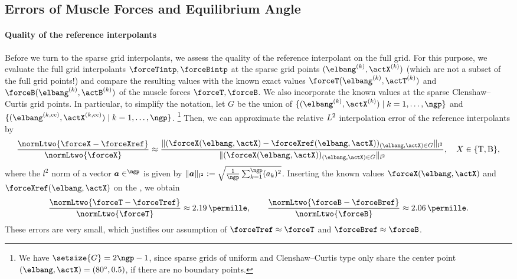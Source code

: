 \subsection{Errors of Muscle Forces and Equilibrium Angle}
\label{sec:732errors}

\paragraph{Quality of the reference interpolants}

Before we turn to the sparse grid interpolants,
we assess the quality of the reference interpolant on the full grid.
For this purpose, we evaluate the full grid interpolants
$\forceTintp, \forceBintp$
at the sparse grid points $(\elbang^{(k)}, \actX^{(k)})$
(which are not a subset of the full grid points!)
and compare the resulting values with the known exact values
$\forceT(\elbang^{(k)}, \actT^{(k)})$ and
$\forceB(\elbang^{(k)}, \actB^{(k)})$
of the muscle forces $\forceT, \forceB$.
We also incorporate the known values at the sparse
Clenshaw--Curtis grid points.
In particular, to simplify the notation,
let $G$ be the union of
$\{(\elbang^{(k)}, \actX^{(k)}) \mid k = 1, \dotsc, \ngp\}$ and
$\{(\elbang^{(k,\cc)}, \actX^{(k,\cc)}) \mid k = 1, \dotsc, \ngp\}$.%
\footnote{%
  We have $\setsize{G} = 2\ngp - 1$, since sparse grids of
  uniform and Clenshaw--Curtis type only
  share the center point $(\elbang, \actX) = (\ang{80}, 0.5)$,
  if there are no boundary points.%
}
Then, we can approximate the relative $L^2$ interpolation error
of the reference interpolants by
\begin{equation}
  \frac{\normLtwo{\forceX - \forceXref}}{\normLtwo{\forceX}}
  \approx
  \frac{
    \norm[l^2]{
      (\forceX(\elbang, \actX) - \forceXref(\elbang, \actX))_
      {(\elbang, \actX) \in G}
    }
  }{
    \norm[l^2]{(\forceX(\elbang, \actX))_{(\elbang, \actX) \in G}}
  },\quad
  X \in \{\mathrm{T}, \mathrm{B}\},
\end{equation}
where the $l^2$ norm of a vector $\*a \in \real^{\ngp}$ is given by
$\norm[l^2]{\*a} := \sqrt{\tfrac{1}{\ngp} \sum_{k=1}^{\ngp} (a_k)^2}$.
Inserting the known values $\forceX(\elbang, \actX)$ and
$\forceXref(\elbang, \actX)$ on the \rhs, we obtain
\begin{equation}
  \frac{\normLtwo{\forceT - \forceTref}}{\normLtwo{\forceT}}
  \approx \SI{2.19}{\permille},\qquad
  \frac{\normLtwo{\forceB - \forceBref}}{\normLtwo{\forceB}}
  \approx \SI{2.06}{\permille}.
\end{equation}
These errors are very small, which justifies our assumption of
$\forceTref \approx \forceT$ and $\forceBref \approx \forceB$.

